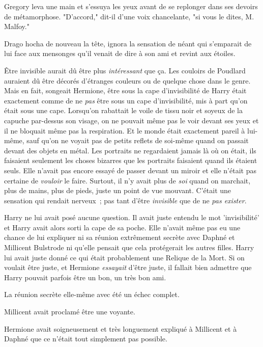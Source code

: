 Gregory leva une main et s'essuya les yeux avant de se replonger dans ses devoirs de métamorphose. "D'accord," dit-il d'une voix chancelante, "si vous le dites, M. Malfoy."

Drago hocha de nouveau la tête, ignora la sensation de néant qui s'emparait de lui face aux mensonges qu'il venait de dire à son ami et revint aux étoiles.


Être invisible aurait dû être plus \emph{intéressant} que ça. Les couloirs de Poudlard auraient dû être décorés d'étranges couleurs ou de quelque chose dans le genre. Mais en fait, songeait Hermione, être sous la cape d'invisibilité de Harry était exactement comme de ne \emph{pas} être sous un cape d'invisibilité, mis à part qu'on était sous une cape. Lorsqu'on rabattait le voile de tissu noir et soyeux de la capuche par-dessus son visage, on ne pouvait même pas le voir devant ses yeux et il ne bloquait même pas la respiration. Et le monde était exactement pareil à lui-même, sauf qu'on ne voyait pas de petits reflets de soi-même quand on passait devant des objets en métal. Les portraits ne regardaient jamais là où on était, ils faisaient seulement les choses bizarres que les portraits faisaient quand ils étaient seuls. Elle n'avait pas encore essayé de passer devant un miroir et elle n'était pas certaine de \emph{vouloir} le faire. Surtout, il n'y avait plus de \emph{soi} quand on marchait, plus de mains, plus de pieds, juste un point de vue mouvant. C'était une sensation qui rendait nerveux~; pas tant d'être \emph{invisible} que de ne \emph{pas exister}.

Harry ne lui avait posé aucune question. Il avait juste entendu le mot 'invisibilité' et Harry avait alors sorti la cape de sa poche. Elle n'avait même pas eu une chance de lui expliquer ni sa réunion extrêmement secrète avec Daphné et Millicent Bulstrode ni qu'elle pensait que cela protégerait les autres filles. Harry lui avait juste donné ce qui était probablement une Relique de la Mort. Si on voulait être juste, et Hermione \emph{essayait} d'être juste, il fallait bien admettre que Harry pouvait parfois être un bon, un très bon ami.

La réunion secrète elle-même avec été un échec complet.

Millicent avait proclamé être une voyante.

Hermione avait soigneusement et très longuement expliqué à Millicent et à Daphné que ce n'était tout simplement pas possible.


